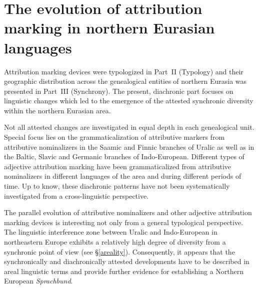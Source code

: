 

\chapter[The evolution of attribution marking]{The evolution of attribution marking in northern Eurasian languages}
Attribution marking devices were typologized in Part~II (Typology) and their geographic distribution across the genealogical entities of northern Eurasia was presented in Part~III (Synchrony). The present, diachronic part focuses on linguistic changes which led to the emergence of the attested synchronic diversity within the northern Eurasian area.

Not all attested changes are investigated in equal depth in each genealogical unit. Special focus lies on the grammaticalization of attributive markers from attributive nominalizers in the Saamic  and Finnic branches of Uralic as well as in the Baltic, Slavic and Germanic branches of Indo-European. Different types of adjective attribution marking have been grammaticalized from attributive nominalizers in different languages of the area and during different periods of time. Up to know, these diachronic patterns have not been systematically investigated from a cross-linguistic perspective.

The parallel evolution of attributive nominalizers and other adjective attribution marking devices is interesting not only from a general typological perspective. The linguistic interference zone between Uralic and Indo-European in northeastern Europe exhibits a relatively high degree of diversity from a synchronic point of view (see \S\ref{areality}). Consequently, it appears that the synchronically and diachronically attested developments have to be described in areal linguistic terms and provide further evidence for establishing a Northern European \textit{Sprachbund}.


